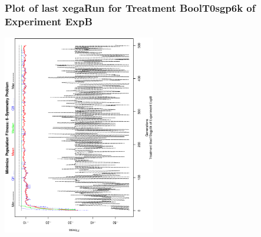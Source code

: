  \begin{frame}
 \frametitle{ Plot of last xegaRun for Treatment BoolT0sgp6k of Experiment ExpB }
 \begin{center}
\includegraphics[width=0.5\textwidth, angle=-90]
{ExpBPlotPopStatsFigure004.eps}
 \end{center}
 \label{report/ExpBPlotPopStatsFigure004.eps}  
 \end{frame}

